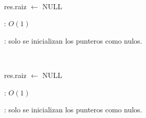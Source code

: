 \begin{Algoritmos}
	~

	\begin{algorithm}[H]
		\NoCaptionOfAlgo
		\caption{}
		res.raiz $\leftarrow$ NULL
	\end{algorithm}

	\complejidad: $O(1)$

	\justifcomp: solo se inicializan los punteros como nulos.

	~

	\begin{algorithm}[H]
		\NoCaptionOfAlgo
		\caption{}
		res.raiz $\leftarrow$ NULL
	\end{algorithm}

	\complejidad: $O(1)$

	\justifcomp: solo se inicializan los punteros como nulos.

\end{Algoritmos}